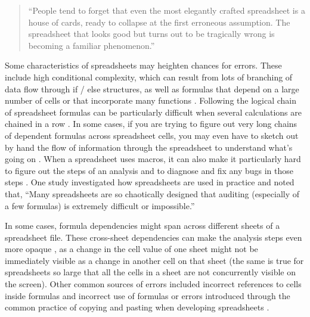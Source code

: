 \documentclass[]{tufte-book}
\begin{document}
\begin{quote}
``People tend to forget that even the most elegantly crafted spreadsheet is a
house of cards, ready to collapse at the first erroneous assumption. The
spreadsheet that looks good but turns out to be tragically wrong is becoming
a familiar phenomenon.'' \citep{levy1984spreadsheet}
\end{quote}

Some characteristics of spreadsheets may heighten chances for errors. These
include high conditional complexity, which can result from lots of branching of
data flow through if / else structures, as well as formulas that depend on a
large number of cells or that incorporate many functions
\citep{hermans2016spreadsheets}. Following the logical chain of spreadsheet formulas
can be particularly difficult when several calculations are chained in a row
\citep{hermans2015enron}. In some cases, if you are trying to figure out very long
chains of dependent formulas across spreadsheet cells, you may even have to
sketch out by hand the flow of information through the spreadsheet to understand
what's going on \citep{nardi1990spreadsheet}. When a spreadsheet uses macros, it can
also make it particularly hard to figure out the steps of an analysis and to
diagnose and fix any bugs in those steps \citep{nash2006spreadsheets, creeth1985microcomputer}. One study investigated how spreadsheets are used in
practice and noted that, ``Many spreadsheets are so chaotically designed that
auditing (especially of a few formulas) is extremely difficult or impossible.''
\citep{powell2009errors}

In some cases, formula dependencies might span across different sheets of a
spreadsheet file. These cross-sheet dependencies can make the analysis steps
even more opaque \citep{hermans2016spreadsheets}, as a change in the cell value of
one sheet might not be immediately visible as a change in another cell on that
sheet (the same is true for spreadsheets so large that all the cells in a sheet
are not concurrently visible on the screen). Other common sources of errors
included incorrect references to cells inside formulas and incorrect use of
formulas \citep{powell2009errors} or errors introduced through the common practice of
copying and pasting when developing spreadsheets \citep{hermans2016spreadsheets}.
\end{document}

